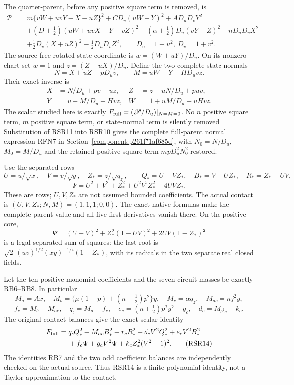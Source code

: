 The quarter-parent, before any positive square term is removed, is
\begin{align*}
\mathscr P={}&m\{vW+uvY-X-uZ\}^2
 +CD_v(uW-Y)^2+AD_uD_vY^2\\
&+(D+\tfrac12)(uW+uvX-Y-vZ)^2
 +(\alpha+\tfrac12)D_u(vY-Z)^2+nD_uD_vX^2\\
&+\tfrac12D_v(X+uZ)^2-\tfrac12D_uD_vZ^2,
\qquad D_u=1+u^2,\ D_v=1+v^2.
 \tag{RSR10}
\end{align*}
The source-free rotated state coordinate is $w=(W+uY)/D_u$.
On its nonzero chart set $w=1$ and $z=(Z-uX)/D_u$. Define
the two complete state normals
\[
 N=X+uZ-pD_uv,\qquad M=uW-Y-HD_uvz.
\]
Their exact inverse is
\[
\begin{aligned}
 X&=N/D_u+pv-uz,& Z&=z+uN/D_u+puv,\\
 Y&=u-M/D_u-Hvz,& W&=1+uM/D_u+uHvz.
\end{aligned}
 \tag{RSR11}
\]
The scalar studied here is exactly
$F_{\rm full}=(\mathscr P/D_u)|_{N=M=0}$.
No $n$ positive square term, $m$ positive square term, or state-normal term is silently removed.
Substitution of RSR11 into RSR10 gives the complete full-parent
normal expression RFN7 in Section~\ref{component:p261f71af685d}, with
$N_0=N/D_u$, $M_0=M/D_u$ and the retained positive square term
$mpD_u^2N_0^2$ restored.

Use the separated rows
\[
 U=u/\sqrt x,\quad V=v/\sqrt y,\quad Z_*=z/\sqrt{q_z},\qquad
 Q_*=U-VZ_*,\quad B_*=V-UZ_*,\quad R_*=Z_*-UV,
\]
\[
 \Psi=U^2+V^2+Z_*^2+U^2V^2Z_*^2-4UVZ_*.
 \tag{RSR12}
\]
These are rows; $U,V,Z_*$ are not assumed bounded coefficients.
The actual contact is $(U,V,Z_*;N,M)=(1,1,1;0,0)$.
The exact native formulas make the complete parent value and all five
first derivatives vanish there. On the positive core,
\[
 \Psi=(U-V)^2+Z_*^2(1-UV)^2+2UV(1-Z_*)^2
 \tag{RSR13}
\]
is a legal separated sum of squares: the last root is
$\sqrt2\,(uv)^{1/2}(xy)^{-1/4}(1-Z_*)$, with its radicals in
the two separate real closed fields.

Let the ten positive monomial coefficients and the seven circuit
masses be exactly RB6--RB8. In particular
\[
 M_a=Ax,\quad M_b=\{\mu(1-p)+(n+\tfrac12)p^2\}y,\quad
 M_c=\alpha q_z,\quad M_{ac}=nj^2y,
\]
\[
 f_c=M_b-M_{ac},\quad q_c=M_a-f_c,\quad
 e_c=(n+\tfrac12)p^2y^2-g_c,\quad d_c=M_{b^2c}-k_c.
\]
The original contact balances give the exact scalar identity
\begin{align*}
 F_{\rm full}={}&q_cQ_*^2+M_{ac}B_*^2+r_cR_*^2
  +d_cV^2Q_*^2+e_cV^2B_*^2\\
 &+f_c\Psi+g_cV^2\Psi+k_cZ_*^2(V^2-1)^2.
 \tag{RSR14}
\end{align*}
The identities RB7 and the two odd coefficient balances are independently
checked on the actual source. Thus RSR14 is a finite polynomial identity,
not a Taylor approximation to the contact.

